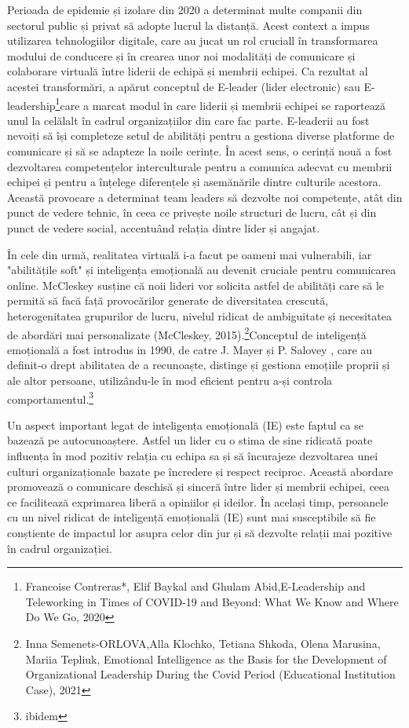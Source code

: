 \documentclass[a4paper, 12pt]{article}
\begin{document}
    \quad\quad Perioada de epidemie și izolare din 2020  a determinat multe companii din sectorul public și privat să adopte lucrul la distanță. Acest context a impus utilizarea tehnologiilor digitale, care au jucat un rol cruciall în transformarea modului de conducere și în crearea unor noi modalități de comunicare și colaborare virtuală între liderii de echipă și membrii echipei. Ca rezultat al acestei transformări, a apărut conceptul de E-leader (lider electronic) sau E-leadership\footnote{Francoise Contreras*, Elif Baykal and Ghulam Abid,E-Leadership and Teleworking in Times of COVID-19 and Beyond: What We Know and Where Do We Go, 2020}care a marcat modul în care liderii și membrii echipei se raportează unul la celălalt în cadrul organizațiilor din care fac parte. E-leaderii au fost nevoiți să își completeze setul de abilități pentru a gestiona diverse platforme de comunicare și să se adapteze la noile cerințe. În acest sens, o cerință nouă a fost dezvoltarea competențelor interculturale pentru a comunica adecvat cu membrii echipei și pentru a înțelege diferențele și asemănările dintre culturile acestora. Această provocare a determinat team leaders să dezvolte noi competențe, atât din punct de vedere tehnic, în ceea ce privește noile structuri de lucru, cât și din punct de vedere social, accentuând relația dintre lider și angajat.

	\quad În cele din urmă,  realitatea virtuală i-a facut pe oameni mai vulnerabili, iar "abilitățile soft" și inteligența emoțională au devenit cruciale pentru comunicarea online. McCleskey susține că noii lideri vor solicita astfel de abilități care să le permită să facă față provocărilor generate de diversitatea crescută, heterogenitatea grupurilor de lucru, nivelul ridicat de ambiguitate și necesitatea de abordări mai personalizate (McCleskey, 2015).\footnote { Inna Semenets-ORLOVA,Alla Klochko, Tetiana Shkoda, Olena Marusina, Mariia Tepliuk, Emotional Intelligence as the Basis for the Development of Organizational Leadership During the Covid Period (Educational Institution Case), 2021}Conceptul de inteligență emoțională a fost introdus in 1990, de catre J. Mayer și P. Salovey , care au definit-o drept abilitatea de a recunoaște, distinge și gestiona emoțiile proprii și ale altor persoane, utilizându-le în mod eficient pentru a-și controla comportamentul.\footnote{ibidem} 

	\quad\quad Un aspect important legat de inteligența emoțională (IE) este faptul ca se bazează pe autocunoaștere. Astfel un lider cu o stima de sine ridicată poate influența în mod pozitiv relația cu echipa sa și să încurajeze dezvoltarea unei culturi organizaționale bazate pe încredere și respect reciproc. Această abordare promovează o comunicare deschisă și sinceră între lider și membrii echipei, ceea ce facilitează exprimarea liberă a opiniilor și ideilor. În același timp, persoanele cu un nivel ridicat de inteligență emoțională (IE) sunt mai susceptibile să fie conștiente de impactul lor asupra celor din jur și să dezvolte relații mai pozitive în cadrul organizației.
\end{document}
